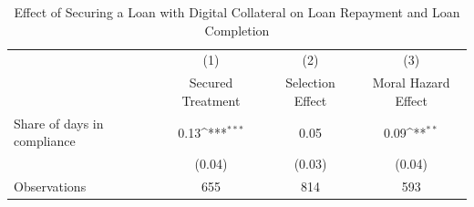 \begin{table}[htbp]\centering
\def\sym#1{\ifmmode^{#1}\else\(^{#1}\)\fi}
\caption{Effect of Securing a Loan with Digital Collateral on Loan Repayment and Loan Completion\label{LASMH\_repay\_LATE\_150}}
\begin{tabular}{l*{3}{c}}
\toprule
                    &\multicolumn{1}{c}{(1)}&\multicolumn{1}{c}{(2)}&\multicolumn{1}{c}{(3)}\\
                    &\multicolumn{1}{c}{Secured Treatment}&\multicolumn{1}{c}{Selection Effect}&\multicolumn{1}{c}{Moral Hazard Effect}\\
\midrule
Share of days in compliance&        0.13\sym{***}&        0.05         &        0.09\sym{**} \\
                    &      (0.04)         &      (0.03)         &      (0.04)         \\
\midrule
Observations        &         655         &         814         &         593         \\
\bottomrule
\end{tabular}
\end{table}
